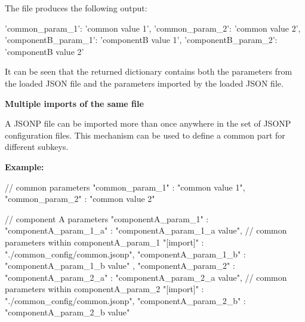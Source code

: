 The file  produces the following output:

\begin{pythonlog}
{'common_param_1': 'common value 1',
 'common_param_2': 'common value 2',
 'componentB_param_1': 'componentB value 1',
 'componentB_param_2': 'componentB value 2'}
\end{pythonlog}

It can be seen that the returned dictionary contains both the parameters from the loaded JSON file and the parameters imported by the loaded JSON file.

\vspace{2ex}

\textbf{Multiple imports of the same file}

A JSONP file can be imported more than once anywhere in the set of JSONP configuration files. This mechanism can be used to define a common part for different subkeys.

\vspace{2ex}

\textbf{Example:}

\vspace{2ex}

\textbullet {}

\begin{pythoncode}
{
   // common parameters
   "common_param_1" : "common value 1",
   "common_param_2" : "common value 2"
}
\end{pythoncode}

\textbullet {}

\begin{pythoncode}[linebackgroundcolor=\hlcode{6,12}]
{
   // component A parameters
   "componentA_param_1" : {
                             "componentA_param_1_a" : "componentA_param_1_a value",
                             // common parameters within componentA_param_1
                             "[import]"             : "./common_config/common.jsonp",
                             "componentA_param_1_b" : "componentA_param_1_b value"
                          },
   "componentA_param_2" : {
                             "componentA_param_2_a" : "componentA_param_2_a value",
                             // common parameters within componentA_param_2
                             "[import]"             : "./common_config/common.jsonp",
                             "componentA_param_2_b" : "componentA_param_2_b value"
                          }
}
\end{pythoncode}


